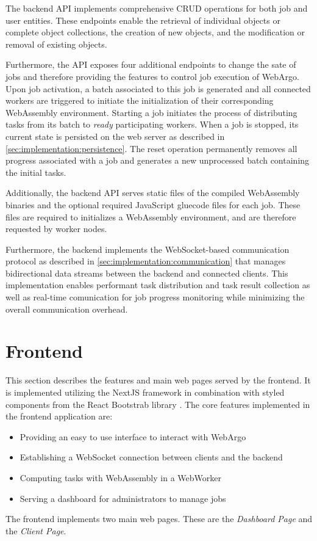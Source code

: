 The backend \ac{API} implements comprehensive \ac{CRUD} operations for both job and user entities. These endpoints enable the retrieval of individual objects or complete object collections, the creation of new objects, and the modification or removal of existing objects.

Furthermore, the \ac{API} exposes four additional endpoints to change the sate of jobs and therefore providing the features to control job execution of WebArgo. Upon job activation, a batch associated to this job is generated and all connected workers are triggered to initiate the initialization of their corresponding WebAssembly environment. Starting a job initiates the process of distributing tasks from its batch to \emph{ready} participating workers. When a job is stopped, its current state is persisted on the web server as described in \autoref{sec:implementation:persistence}. The reset operation permanently removes all progress associated with a job and generates a new unprocessed batch containing the initial tasks.

Additionally, the backend \ac{API} serves static files of the compiled WebAssembly binaries and the optional required JavaScript gluecode files for each job. These files are required to initializes a WebAssembly environment, and are therefore requested by worker nodes.

Furthermore, the backend implements the WebSocket-based communication protocol as described in \autoref{sec:implementation:communication} that manages bidirectional data streams between the backend and connected clients. This implementation enables performant task distribution and task result collection as well as real-time comunication for job progress monitoring while minimizing the overall communication overhead.

\section{Frontend}
\label{sec:implementation:frontend}
This section describes the features and main web pages served by the frontend. It is implemented utilizing the NextJS \cite{methodology:nextjs} framework in combination with styled components from the React Bootstrab library \cite{implementation:bootstrap}. The core features implemented in the frontend application are:
\begin{itemize}
    \item Providing an easy to use interface to interact with WebArgo
    \item Establishing a WebSocket connection between clients and the backend
    \item Computing tasks with WebAssembly in a WebWorker
    \item Serving a dashboard for administrators to manage jobs
\end{itemize}
The frontend implements two main web pages. These are the \emph{Dashboard Page} and the \emph{Client Page}.

